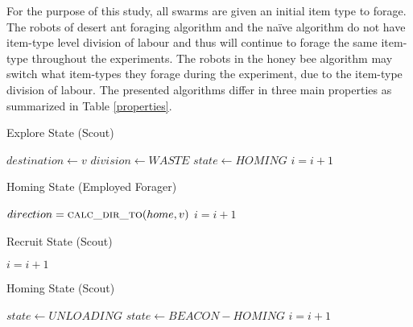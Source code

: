 For the purpose of this study, all swarms are given an initial item type to forage. The robots of desert ant foraging algorithm and the na\"ive algorithm do not have item-type level division of labour and thus will continue to forage the same item-type throughout the experiments. The robots in the honey bee algorithm may switch what item-types they forage during the experiment, due to the item-type division of labour. The presented algorithms differ in three main properties as summarized in Table \ref{properties}.

\begin{algorithm}
\caption{Explore State (Scout)}
\label{algorithm:explore}
\begin{algorithmic}[1]
\State {}
\State {}
 	\State {}
	\State $destination \gets v$
	\State {}
	\State $division \gets WASTE$
	\State $state \gets HOMING$
\EndIf
\State $i =i + 1$
\EndFunction
\end{algorithmic}
\end{algorithm}

\begin{algorithm}
\caption{Homing State (Employed Forager)}
\label{algorithm:employedforager:homing}
\begin{algorithmic}[1]
\State $direction = \Call{calc\_dir\_to}{home,v}$
\State {}
\EndIf
\State $i =i + 1$
\EndFunction
\end{algorithmic}
\end{algorithm}

\begin{algorithm}
\caption{Recruit State (Scout)}
\label{algorithm:recruit}
\begin{algorithmic}[1]
	\State {} 
\Else 
	\Else
	\EndIf
\EndIf
\State $i =i + 1$
\EndFunction
\end{algorithmic}
\end{algorithm}

\begin{algorithm}
\caption{Homing State (Scout)}
\label{algorithm:scout:homing}
\begin{algorithmic}[1]
	
\EndIf
{}
	\State {}
		\State $state \gets UNLOADING$
	\Else
		\State $state \gets BEACON-HOMING$	
	\EndIf
\EndIf
\State $i =i + 1$
\EndFunction
\end{algorithmic}
\end{algorithm}

